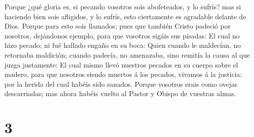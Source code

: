  Porque ¿qué gloria es, si pecando vosotros sois
abofeteados, y lo sufrís? mas si haciendo bien sois afligidos, y lo
sufrís, esto ciertamente es agradable delante de Dios. 
Porque para esto sois llamados; pues que también Cristo padeció por
nosotros, dejándonos ejemplo, para que vosotros sigáis sus pisadas:
 El cual no hizo pecado; ni fué hallado engaño en su boca:
 Quien cuando le maldecían, no retornaba maldición; cuando
padecía, no amenazaba, sino remitía la causa al que juzga justamente:
 El cual mismo llevó nuestros pecados en su cuerpo sobre el
madero, para que nosotros siendo muertos á los pecados, vivamos á la
justicia: por la herida del cual habéis sido sanados. 
Porque vosotros erais como ovejas descarriadas; mas ahora habéis vuelto
al Pastor y Obispo de vuestras almas.

\hypertarget{section-2}{%
\section{3}\label{section-2}}

